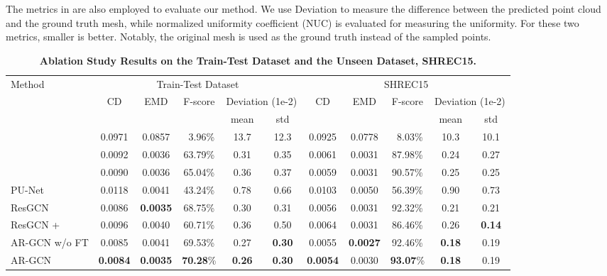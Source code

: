 \documentclass[10pt,twocolumn,letterpaper]{article}
\begin{document}
The metrics in \cite{yu2018pu} are also employed to evaluate our method.
We use Deviation to measure the difference between the predicted point cloud and the ground truth mesh, while normalized uniformity coefficient (NUC) is evaluated for measuring the uniformity.
For these two metrics, smaller is better.
Notably, the original mesh is used as the ground truth instead of the sampled  points.

\begin{table*}[ht]
\small
\begin{center}
\begin{tabular}{l|cc|c|cc||cc|c|cc}
\hline
\multirow{3}{*}{Method} & \multicolumn{5}{c||}{Train-Test Dataset} & \multicolumn{5}{c}{SHREC15} \\
\cline{2-11}
& \multirow{2}{*}{CD} & \multirow{2}{*}{EMD} & \multicolumn{1}{|c}{F-score} & \multicolumn{2}{|c||}{Deviation (1e-2)} & \multirow{2}{*}{CD} & \multirow{2}{*}{EMD} & \multicolumn{1}{|c}{F-score} & \multicolumn{2}{|c}{Deviation (1e-2)} \\
\cline{4-6}
\cline{9-11}
& & &  & mean & std & & &  & mean & std \\
\hline
\hline
 & 0.0971 & 0.0857 & ~3.96\% & 13.7 & 12.3 & 0.0925 & 0.0778 & ~8.03\% & 10.3 & 10.1\\
 & 0.0092 & 0.0036 & 63.79\% & 0.31 & 0.35 & 0.0061 & 0.0031 & 87.98\% & 0.24 & 0.27 \\
 & 0.0090 & 0.0036 & 65.04\% & 0.36 & 0.37 & 0.0059 & 0.0031 & 90.57\% & 0.25 & 0.25 \\
\hline
PU-Net~\cite{yu2018pu} & 0.0118 & 0.0041 & 43.24\% & 0.78 & 0.66 & 0.0103 & 0.0050 & 56.39\% & 0.90 & 0.73\\
ResGCN & 0.0086 & \textbf{0.0035} & 68.75\% & 0.30 & 0.31 & 0.0056 & 0.0031 & 92.32\% & 0.21 & 0.21\\
ResGCN +  & 0.0096 & 0.0040 & 60.71\% & 0.36 & 0.50 & 0.0064 & 0.0031 & 86.46\% & 0.26 & \textbf{0.14} \\
\hline
AR-GCN w/o FT & 0.0085 & 0.0041 & 69.53\% & 0.27 & \textbf{0.30} & 0.0055 & \textbf{0.0027} & 92.46\% & \textbf{0.18} & 0.19 \\
AR-GCN & \textbf{0.0084} & \textbf{0.0035} & \textbf{70.28}\% & \textbf{0.26} & \textbf{0.30} & \textbf{0.0054} & 0.0030 & \textbf{93.07}\% & \textbf{0.18} & 0.19 \\
\hline
\end{tabular}
\end{center}
	\vspace{-1.5em}
	\caption{\textbf{Ablation Study Results on the Train-Test Dataset and the Unseen Dataset, SHREC15.}}
	\vspace{-1em}
	\label{table:ablation_result}
\end{table*}
\end{document}
